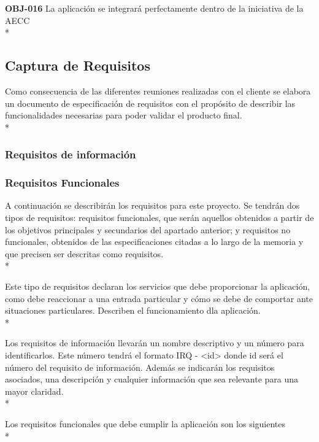 \documentclass[../pfc.tex]{subfiles}
\begin{document}
	\textbf{OBJ-016}	La aplicación se integrará perfectamente dentro de la iniciativa de la AECC\\*
	
	

	
	
	\subsection{Captura de Requisitos}
	
	Como consecuencia de las diferentes reuniones realizadas con el cliente se elabora un
	documento de especificación de requisitos con el propósito de describir las funcionalidades
	necesarias para poder validar el producto final.\\*
	
	\subsubsection{Requisitos de información}
			
	
	\subsubsection{Requisitos Funcionales}
	
	A continuación se describirán los requisitos para este proyecto. Se tendrán dos tipos de
	requisitos: requisitos funcionales, que serán aquellos obtenidos a partir de los objetivos principales
	y secundarios del apartado anterior; y requisitos no funcionales, obtenidos de las especificaciones
	citadas a lo largo de la memoria y que precisen ser descritas como requisitos.\\*
	
	Este tipo de requisitos declaran los servicios que debe proporcionar la aplicación, como debe
	reaccionar a una entrada particular y cómo se debe de comportar ante situaciones particulares.
	Describen el funcionamiento dla aplicación.\\*
	
	Los requisitos de información llevarán un nombre descriptivo y un número para identificarlos.
	Este número tendrá el formato IRQ - <id> donde id será el número del requisito de información.
	Además se indicarán los requisitos asociados, una descripción y cualquier información que sea
	relevante para una mayor claridad.\\*
	
	Los requisitos funcionales que debe cumplir la aplicación son los siguientes\\*
	
\end{document}

